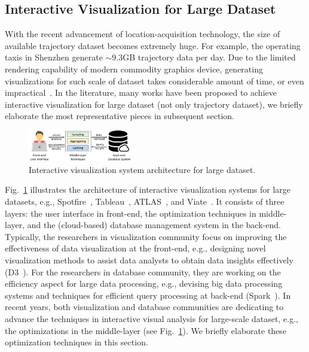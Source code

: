 \subsection{Interactive Visualization for Large Dataset}\label{sec:interactive}
{With the recent advancement of location-acquisition technology, the size of available trajectory dataset becomes extremely huge.}
For example, the operating taxis in Shenzhen generate {$\sim$}9.3GB trajectory data per day.
Due to the limited rendering capability of modern commodity graphics device, generating visualizations for such scale of dataset takes considerable amount of time,
or even impractical~\cite{park2016visualization}.
In the literature, many works have been proposed to achieve interactive visualization {for} large dataset (not only trajectory dataset),
we briefly elaborate the most representative pieces in subsequent section. %

\begin{figure}
	\centering
	\includegraphics[width=0.40\textwidth]{pictures/framework/framework.pdf}
	\vspace{-3mm}
	\caption{Interactive visualization system architecture for large dataset.} \label{fig:framework}
    \vspace{-6mm}
\end{figure}

Fig.~\ref{fig:framework} illustrates the architecture of interactive visualization systems for large datasets,
e.g., Spotfire~\cite{Spotfire}, Tableau~\cite{Tableau}, ATLAS~\cite{chan2008maintaining}, and Viate~\cite{yang2019vaite}.
{It} consists of three layers: the user interface in front-end, the optimization techniques in middle-layer, and the (cloud-based) database management system in the back-end.
{Typically, the researchers in visualization community focus on improving the effectiveness of data visualization at the front-end,
e.g., designing novel visualization methods to assist data analysts to obtain data insights effectively (D3~\cite{d3}).}
For the researchers in database community, they are working on the efficiency aspect for large data processing, e.g., devising big data processing systems and techniques for efficient query processing at back-end (Spark~\cite{spark}).
In recent years, both visualization and database communities are dedicating to advance the techniques in interactive visual analysis for large-scale dataset,
e.g., the optimizations in the middle-layer (see Fig.~\ref{fig:framework}).
We briefly elaborate these optimization techniques {in this section}. %


